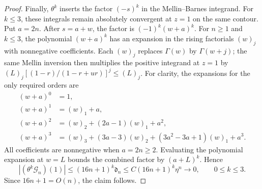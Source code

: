 \documentclass[11pt]{article}
\begin{document}
\begin{proof}
Finally, $\theta^k$ inserts the factor $(-s)^k$ in the Mellin--Barnes
integrand. For $k\leq3$, these integrals
remain absolutely convergent at $z=1$ on the same contour.
Put $a=2n$. After $s=a+w$, the factor is
$(-1)^k(w+a)^k$.
For $n\geq1$ and $k\leq3$, the polynomial $(w+a)^k$ has an expansion
in the rising factorials $(w)_j$ with nonnegative coefficients.
Each $(w)_j$ replaces $\Gamma(w)$ by $\Gamma(w+j)$; the same Mellin
inversion then multiplies the positive integrand at $z=1$ by
$(L)_j[(1-r)/(1-r+ur)]^j\leq(L)_j$.
For clarity, the expansions for the only required orders are
\begin{align*}
 (w+a)^0&=1,\\
 (w+a)^1&=(w)_1+a,\\
 (w+a)^2&=(w)_2+(2a-1)(w)_1+a^2,\\
 (w+a)^3&=(w)_3+(3a-3)(w)_2+(3a^2-3a+1)(w)_1+a^3.
\end{align*}
All coefficients are nonnegative when $a=2n\geq2$.
Evaluating the polynomial expansion at $w=L$ bounds the combined
factor by $(a+L)^k$. Hence
\[
|(\theta^k\mathcal{G}_n)(1)|
\leq
(16n+1)^k\mathfrak d_n
\leq C(16n+1)^k\eta^n\longrightarrow0,
\qquad 0\leq k\leq3.
\]
Since $16n+1=O(n)$, the claim follows.
\end{proof}
\end{document}
